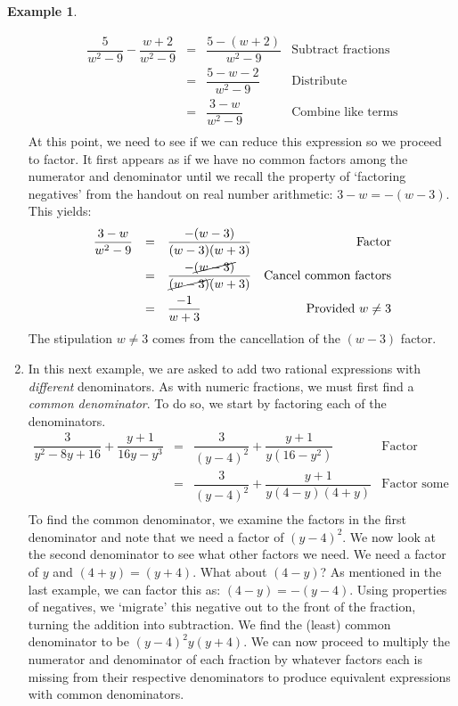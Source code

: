 \documentclass[11pt]{article}
\theoremstyle{definition}  %
\newtheorem{ex}{\bf Example}
\begin{document}
\begin{ex}
\begin{enumerate}
\[\begin{array}{rclr}
\dfrac{5}{w^2 - 9} - \dfrac{w+2}{w^2-9} & = & \dfrac{5 - (w+2)}{w^2 - 9}& \text{Subtract fractions}\\ [8pt]
                                        & = & \dfrac{5 - w - 2}{w^2-9} & \text{Distribute} \\ [8pt]
																				& = & \dfrac{3-w}{w^2-9} & \text{Combine like terms} \\ \end{array}\]
At this point, we need to see if we can reduce this expression so we proceed to factor.  It first appears as if we have no common factors among the numerator and denominator until we recall the property of `factoring negatives' from the handout on real number arithmetic:  $3-w = -(w-3)$. This yields:\[ \begin{array}{rclr}

\dfrac{3-w}{w^2-9} & = & \dfrac{-(w-3)}{(w-3)(w+3)} & \text{Factor} \\ [10pt]
                   & = & \dfrac{-\cancel{(w-3)}}{\cancel{(w-3)}(w+3)} & \text{Cancel common factors} \\ [10pt]
									 & = & \dfrac{-1}{w+3} & \text{Provided $w \neq 3$} \\ 
									\end{array}\]
The stipulation $w \neq 3$ comes from the cancellation of the $(w-3)$ factor.

\item  	In this next example, we are asked to add two rational expressions with \textit{different} denominators.  As with numeric fractions, we must first find a \textit{common denominator}. To do so, we start by factoring each of the denominators. \[ \begin{array}{rclr}

\dfrac{3}{y^2 - 8y + 16} + \dfrac{y+1}{16y - y^3} & = & \dfrac{3}{(y-4)^2} + \dfrac{y+1}{y(16 - y^2)} & \text{Factor} \\	[8pt]		
                                                  & = & \dfrac{3}{(y-4)^2} + \dfrac{y+1}{y(4-y)(4+y)} & \text{Factor some more} \\
																									
																									\end{array}\]
To find the common denominator, we examine the factors in the first denominator and note that we need a factor of $(y-4)^2$.  We now look at the second denominator to see what other factors we need. We need a factor of $y$ and $(4+y) = (y+4)$.  What about $(4-y)$?  As mentioned in the last example, we can factor this as: $(4-y) = -(y-4)$. Using properties of negatives, we `migrate' this negative out to the front of the fraction, turning the addition into subtraction.  We find the (least) common denominator to be $(y-4)^2 y (y+4)$.  We can now proceed to multiply the numerator and denominator of each fraction by whatever factors each is missing from their respective denominators to produce equivalent expressions with common denominators. \[ \begin{array}{rclr}


\end{array}\]
\end{enumerate}
\end{ex}
\end{document}

